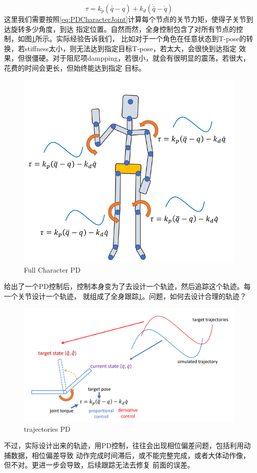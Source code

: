 \documentclass[lang=cn,newtx,10pt,scheme=chinese]{elegantbook}
\begin{document}
\begin{equation}
  \label{eq:PDCharacterJoint}
  \tau=k_p(\overline{\bar{q}}-q)+k_d(\dot{\bar{q}}-\dot{q})
\end{equation}
这里我们需要按照\ref{eq:PDCharacterJoint}计算每个节点的关节力矩，使得子关节到达旋转多少角度，到达
指定位置。自然而然，全身控制包含了对所有节点的控制，如图\ref{fig:FullCharacterPD}所示。实际经验告诉我们，
比如对于一个角色在任意状态到T-pose的转换，若stiffness太小，则无法达到指定目标T-pose，若太大，会很快到达指定
效果，但很僵硬。对于阻尼项dampping，若很小，就会有很明显的震荡，若很大，花费的时间会更长，但始终能达到指定
目标。
\begin{figure}[htbp]
  \centering
  \includegraphics[totalheight=1.5in]{"./image/FullCharacterPD.png"}
  \caption{Full Character PD} \label{fig:FullCharacterPD}
\end{figure}

给出了一个PD控制后，控制本身变为了去设计一个轨迹，然后追踪这个轨迹。每一个关节设计一个轨迹，
就组成了全身跟踪\ref{fig:FullCharacterPD}。问题，如何去设计合理的轨迹？
\begin{figure}[htbp]
  \centering
  \includegraphics[totalheight=1.5in]{"./image/trajectoriesPD.png"}
  \caption{trajectories PD} \label{fig:trajectoriesPD}
\end{figure}
不过，实际设计出来的轨迹，用PD控制，往往会出现相位偏差问题，包括利用动捕数据，相位偏差导致
动作完成时间滞后，或不能完整完成，或者大体动作像，但不对。更进一步会导致，后续跟踪无法去修复
前面的误差。
\end{document}
